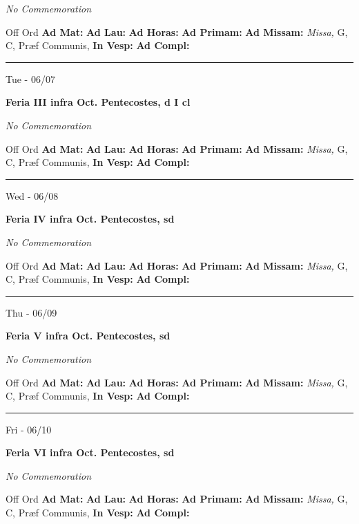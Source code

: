 \documentclass[letterpaper, 10pt]{article}
\begin{document}
\textit{No Commemoration}\begin{justify}
Off Ord
\textbf{Ad Mat: }
\textbf{Ad Lau: }
\textbf{Ad Horas: }
\textbf{Ad Primam: }
\textbf{Ad Missam:} \textit{Missa, } G, C, Præf Communis, 
\textbf{In Vesp: }
\textbf{Ad Compl: }\end{justify}



\hrule
\begin{center}
Tue - 06/07
\end{center}\textbf{ \large Feria III infra Oct. Pentecostes, \textnormal{\normalsize d I cl}}

\textit{No Commemoration}\begin{justify}
Off Ord
\textbf{Ad Mat: }
\textbf{Ad Lau: }
\textbf{Ad Horas: }
\textbf{Ad Primam: }
\textbf{Ad Missam:} \textit{Missa, } G, C, Præf Communis, 
\textbf{In Vesp: }
\textbf{Ad Compl: }\end{justify}



\hrule
\begin{center}
Wed - 06/08
\end{center}\textbf{ \large Feria IV infra Oct. Pentecostes, \textnormal{\normalsize sd}}

\textit{No Commemoration}\begin{justify}
Off Ord
\textbf{Ad Mat: }
\textbf{Ad Lau: }
\textbf{Ad Horas: }
\textbf{Ad Primam: }
\textbf{Ad Missam:} \textit{Missa, } G, C, Præf Communis, 
\textbf{In Vesp: }
\textbf{Ad Compl: }\end{justify}



\hrule
\begin{center}
Thu - 06/09
\end{center}\textbf{ \large Feria V infra Oct. Pentecostes, \textnormal{\normalsize sd}}

\textit{No Commemoration}\begin{justify}
Off Ord
\textbf{Ad Mat: }
\textbf{Ad Lau: }
\textbf{Ad Horas: }
\textbf{Ad Primam: }
\textbf{Ad Missam:} \textit{Missa, } G, C, Præf Communis, 
\textbf{In Vesp: }
\textbf{Ad Compl: }\end{justify}



\hrule
\begin{center}
Fri - 06/10
\end{center}\textbf{ \large Feria VI infra Oct. Pentecostes, \textnormal{\normalsize sd}}

\textit{No Commemoration}\begin{justify}
Off Ord
\textbf{Ad Mat: }
\textbf{Ad Lau: }
\textbf{Ad Horas: }
\textbf{Ad Primam: }
\textbf{Ad Missam:} \textit{Missa, } G, C, Præf Communis, 
\textbf{In Vesp: }
\textbf{Ad Compl: }\end{justify}
\end{document}
